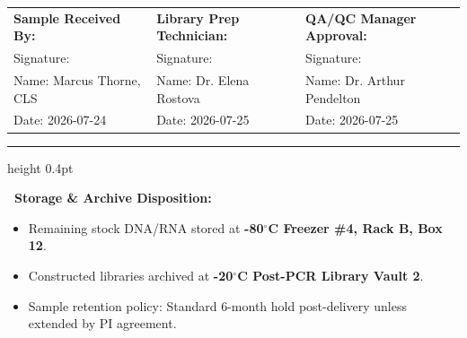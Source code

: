 \documentclass[10pt,a4paper]{article}
\begin{document}
\begin{tcolorbox}[
  enhanced,
  colback=white,
  colframe=PrimaryBlue,
  arc=2pt,
  boxrule=0.5pt,
  left=8pt, right=8pt, top=8pt, bottom=8pt
]
  \fontsize{8.5pt}{12pt}\selectfont
  \begin{tabularx}{\linewidth}{@{}X X X@{}}
    \textbf{Sample Received By:} & \textbf{Library Prep Technician:} & \textbf{QA/QC Manager Approval:} \\[12pt]
    Signature: \underline{\hspace{4cm}} & Signature: \underline{\hspace{4cm}} & Signature: \underline{\hspace{4cm}} \\[6pt]
    Name: Marcus Thorne, CLS & Name: Dr. Elena Rostova & Name: Dr. Arthur Pendelton \\
    Date: 2026-07-24 & Date: 2026-07-25 & Date: 2026-07-25 \\
  \end{tabularx}

  \vspace{8pt}
  \color{DarkText}\hrule height 0.4pt
  \vspace{6pt}

  \fontsize{8pt}{10.5pt}\selectfont
  \textbf{\faInfoCircle\ Storage \& Archive Disposition:}
  \begin{itemize}[leftmargin=12pt, itemsep=1pt]
    \item Remaining stock DNA/RNA stored at \textbf{-80\ensuremath{^\circ}C Freezer \#4, Rack B, Box 12}.
    \item Constructed libraries archived at \textbf{-20\ensuremath{^\circ}C Post-PCR Library Vault 2}.
    \item Sample retention policy: Standard 6-month hold post-delivery unless extended by PI agreement.
  \end{itemize}
\end{tcolorbox}
\end{document}
